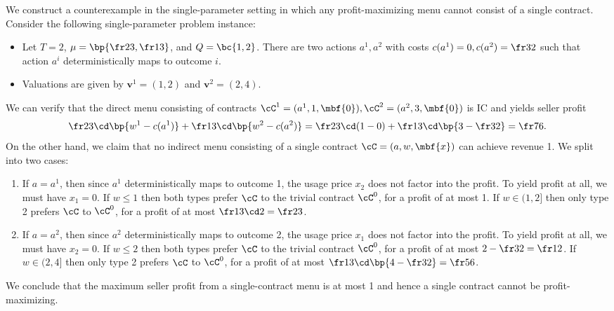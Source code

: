 We construct a counterexample in the single-parameter setting in which any profit-maximizing menu cannot consist of a single contract. Consider the following single-parameter problem instance:
    \begin{itemize}
        \item Let $T=2$, $\mu = \bp{\fr23, \fr13}$, and $Q = \bc{1,2}$. There are two actions $a^1, a^2$ with costs $c(a^1) = 0, c(a^2) = \fr32$ such that action $a^i$ deterministically maps to outcome $i$.

        \item Valuations are given by $\mathbf{v}^1 = (1,2)$ and $\mathbf{v}^2 = (2,4)$.
    \end{itemize}
We can verify that the direct menu consisting of contracts $\cC^1 = (a^1, 1, \mbf{0}), \cC^2 = (a^2, 3, \mbf{0})$ is IC and yields seller profit $$\fr23 \cd \bp{w^1 - c(a^1)} + \fr13 \cd \bp{w^2 - c(a^2)} = \fr23 \cd (1-0) + \fr13 \cd \bp{3 - \fr32} = \fr76.$$ On the other hand, we claim that no indirect menu consisting of a single contract $\cC = (a, w, \mbf{x})$ can achieve revenue 1. We split into two cases:
\begin{enumerate}
    \item[\tbf{Case 1.}] If $a = a^1$, then since $a^1$ deterministically maps to outcome 1, the usage price $x_2$ does not factor into the profit. To yield profit at all, we must have $x_1 = 0$. If $w \le 1$ then both types prefer $\cC$ to the trivial contract $\cC^0$, for a profit of at most 1. If $w\in (1, 2]$ then only type 2 prefers $\cC$ to $\cC^0$, for a profit of at most $\fr13 \cd 2 = \fr23$.

    \item[\tbf{Case 2.}] If $a = a^2$, then since $a^2$ deterministically maps to outcome 2, the usage price $x_1$ does not factor into the profit. To yield profit at all, we must have $x_2 = 0$. If $w \le 2$ then both types prefer $\cC$ to the trivial contract $\cC^0$, for a profit of at most $2 - \fr32 = \fr12$. If $w\in (2, 4]$ then only type 2 prefers $\cC$ to $\cC^0$, for a profit of at most $\fr13 \cd \bp{4 - \fr32} = \fr56$.
\end{enumerate}
We conclude that the maximum seller profit from a single-contract menu is at most 1 and hence a single contract cannot be profit-maximizing.
